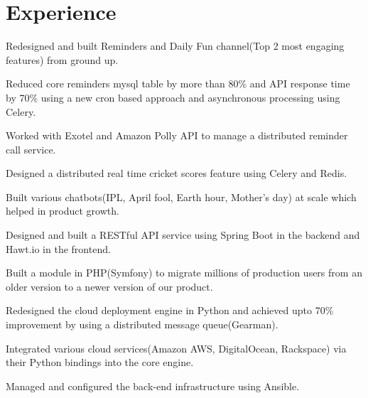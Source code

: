\documentclass[]{deedy-resume-openfont}
\begin{document}
\begin{minipage}[t]{0.66\textwidth}


\section{Experience}

\vspace{\topsep}
\begin{tightemize}
\item Redesigned and built Reminders and Daily Fun channel(Top 2 most engaging features) from ground up.
\item Reduced core reminders mysql table by more than 80\% and API response time by 70\% using a new cron based approach and asynchronous processing using Celery.
\item Worked with Exotel and Amazon Polly API to manage a distributed reminder call service.
\item Designed a distributed real time cricket scores feature using Celery and Redis.
\item Built various chatbots(IPL, April fool, Earth hour, Mother's day) at scale which helped in product growth.
\end{tightemize}
\sectionsep

\vspace{\topsep} %
\begin{tightemize}
\item Designed and built a RESTful API service using Spring Boot in the backend and Hawt.io in the frontend.
\item Built a module in PHP(Symfony) to migrate millions of production users from an older version to a newer version of our product.
\end{tightemize}
\sectionsep

\begin{tightemize}
\item Redesigned the cloud deployment engine in Python and achieved upto 70\% improvement by using a distributed message queue(Gearman).
\item Integrated various cloud services(Amazon AWS, DigitalOcean, Rackspace) via their Python bindings into the core engine.
\item Managed and configured the back-end infrastructure using Ansible.
\end{tightemize}
\sectionsep


\end{minipage}
\end{document}
